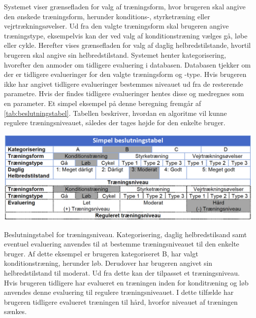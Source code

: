 \noindent
Systemet viser grænsefladen for valg af træningsform, hvor brugeren skal angive den ønskede træningsform, herunder konditions-, styrketræning eller vejrtrækningsøvelser. Ud fra den valgte træningsform skal brugeren angive træningstype, eksempelvis kan der ved valg af konditionstræning vælges gå, løbe eller cykle. Herefter vises grænsefladen for valg af daglig helbredstilstande, hvortil brugeren skal angive sin helbredstilstand. Systemet henter kategorisering, hvorefter den anmoder om tidligere evaluering i databasen. Databasen tjekker om der er tidligere evalueringer for den valgte træningsform og -type. Hvis brugeren ikke har angivet tidligere evalueringer bestemmes niveauet ud fra de resterende parametre. Hvis der findes tidligere evalueringer hentes disse og medregnes som en parameter.  Et simpel eksempel på denne beregning fremgår af \autoref{tab:beslutningstabel}. Tabellen beskriver, hvordan en algoritme vil kunne regulere træningsniveauet, således der tages højde for den enkelte bruger.

\begin{table}[H]
\centering
\includegraphics[width=1\textwidth]{figures/aktivitetsdiagram/beslutningstabel}
\caption{Beslutningstabel for træningsniveau. Kategorisering, daglig helbredstilsand samt eventuel evaluering anvendes til at bestemme træningsniveauet til den enkelte bruger. Af dette eksempel er brugeren kategoriseret B, har valgt konditionstræning, herunder løb. Derudover har brugeren angivet sin helbredstilstand til moderat. Ud fra dette kan der tilpasset et træningsniveau. Hvis brugeren tidligere har evalueret en træningen inden for konditræning og løb anvendes denne evaluering til regulere træningsniveauet. I dette tilfælde har brugeren tidligere evalueret træningen til hård, hvorfor niveauet af træningen sænkes.}
\label{tab:beslutningstabel}
\end{table} 

